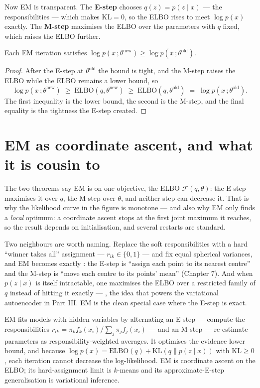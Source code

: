 \documentclass[11pt]{article}
\begin{document}
Now EM is transparent. The \textbf{E-step} chooses $q(z)=p(z\mid x)$ --- the
responsibilities --- which makes $\mathrm{KL}=0$, so the ELBO rises to meet
$\log p(x)$ exactly. The \textbf{M-step} maximises the ELBO over the
parameters with $q$ fixed, which raises the ELBO further.

\begin{theorem}
Each EM iteration satisfies $\log p(x\,;\theta^{\text{new}}) \ge
\log p(x\,;\theta^{\text{old}})$.
\end{theorem}
\begin{proof}
After the E-step at $\theta^{\text{old}}$ the bound is tight, and the M-step
raises the ELBO while the ELBO remains a lower bound, so
\[
  \log p(x\,;\theta^{\text{new}}) \;\ge\; \mathrm{ELBO}(q,\theta^{\text{new}})
  \;\ge\; \mathrm{ELBO}(q,\theta^{\text{old}}) \;=\; \log p(x\,;\theta^{\text{old}}).
\]
The first inequality is the lower bound, the second is the M-step, and the
final equality is the tightness the E-step created.
\end{proof}

\section{EM as coordinate ascent, and what it is cousin to}

The two theorems say EM is  on one objective, the
ELBO $\mathcal{F}(q,\theta)$: the E-step maximises it over $q$, the M-step
over $\theta$, and neither step can decrease it. That is why the likelihood
curve in the figure is monotone --- and also why EM only finds a \emph{local}
optimum: a coordinate ascent stops at the first joint maximum it reaches, so
the result depends on initialisation, and several restarts are standard.

Two neighbours are worth naming. Replace the soft responsibilities with a hard
``winner takes all'' assignment --- $r_{ik}\in\{0,1\}$ --- and fix equal
spherical variances, and EM becomes exactly : the E-step is
``assign each point to its nearest centre'' and the M-step is ``move each
centre to its points' mean'' (Chapter 7). And when $p(z\mid x)$ is itself
intractable, one maximises the ELBO over a restricted family of $q$ instead of
hitting it exactly --- , the idea that powers
the variational autoencoder in Part III. EM is the clean special case where
the E-step is exact.

\begin{summarybox}
EM fits models with hidden variables by alternating an E-step --- compute the
responsibilities $r_{ik}=\pi_k f_k(x_i)/\sum_j \pi_j f_j(x_i)$ --- and an
M-step --- re-estimate parameters as responsibility-weighted averages. It
optimises the evidence lower bound, and because
$\log p(x) = \mathrm{ELBO}(q) + \mathrm{KL}(q\|p(z\mid x))$ with
$\mathrm{KL}\ge 0$, each iteration cannot decrease the log-likelihood. EM is
coordinate ascent on the ELBO; its hard-assignment limit is $k$-means and its
approximate-E-step generalisation is variational inference.
\end{summarybox}
\end{document}
